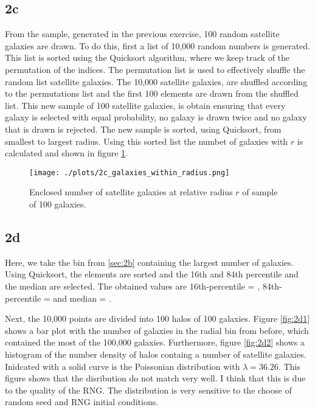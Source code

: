 \subsection*{2c}
From the sample, generated in the previous exercise, 100 random satellite galaxies are drawn. To do this, first a list of 10,000 random numbers is generated. This list is sorted using the Quicksort algorithm, where we keep track of the permutation of the indices. The permutation list is used to effectively shuffle the random list satellite galaxies. The 10,000 satellite galaxies, are shuffled according to the permutations list and the first 100 elements are drawn from the shuffled list. This new sample of 100 satellite galaxies, is obtain ensuring that every galaxy is selected with equal probability, no galaxy is drawn twice and no galaxy that is drawn is rejected. The new sample is sorted, using Quicksort, from smallest to largest radius. Using this sorted list the numbet of galaxies with $r$ is calculated and shown in figure \ref{fig:2c}.

\begin{figure}[!ht]
  \centering
  \texttt{[image: ./plots/2c\_galaxies\_within\_radius.png]}
  \caption{Enclosed number of satellite galaxies at relative radius $r$ of sample of 100 galaxies.}
  \label{fig:2c}
\end{figure}

\subsection*{2d}
Here, we take the bin from \ref{sec:2b} containing the largest number of galaxies. Using Quicksort, the elements are sorted and the 16th and 84th percentile and the median are selected. The obtained values are 16th-percentile = , 84th-percentile =  and median = .

Next, the 10,000 points are divided into 100 halos of 100 galaxies. Figure \ref{fig:2d1} shows a bar plot with the number of galaxies in the radial bin from before, which contained the most of the 100,000 galaxies. Furthermore, figure \ref{fig:2d2} shows a histogram of the number density of halos containg a number of satellite galaxies. Inidcated with a solid curve is the Poissonian distribution with $\lambda =  36.26$. This figure shows that the disribution do not match very well. I think that this is due to the quality of the RNG. The distribution is very sensitive to the choose of random seed and RNG initial conditions. 

